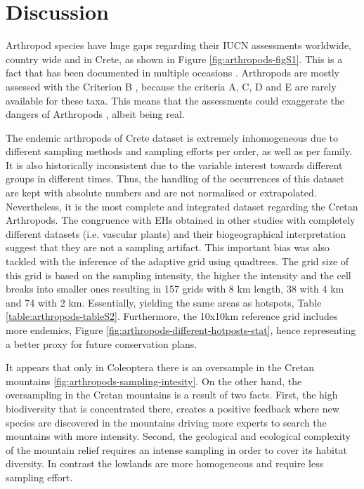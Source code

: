 \section{Discussion}
\label{sec:arthropods-discussion}

Arthropod species have huge gaps regarding their IUCN assessments worldwide,
country wide and in Crete, as shown in Figure \ref{fig:arthropods-figS1}. 
This is a fact that has been documented in multiple occasions \parencite{cardoso2012the-underrepresentation, chowdhury2023protected}. 
Arthropods are mostly assessed with the Criterion B \parencite{cardoso2011adapting,carpaneto2015a-red-list},
because the criteria A, C, D and E are rarely available for these taxa.
This means that the assessments could exaggerate the dangers of Arthropods \parencite{cardoso2011adapting},
albeit being real. 

The endemic arthropods of Crete dataset is extremely inhomogeneous due to
different sampling methods and sampling efforts per order, as well as per family.
It is also historically inconsistent due to the variable interest towards
different groups in different times.
Thus, the handling of the occurrences of this dataset are kept with absolute numbers 
and are not normalised or extrapolated. 
Nevertheless, it is the most complete and integrated dataset regarding the Cretan Arthropods.
The congruence with EHs obtained in other studies with completely different
datasets (i.e. vascular plants) \parencite{kougioumoutzis2020plant} and their biogeographical interpretation suggest
that they are not a sampling artifact. 
This important bias was also tackled with the inference of the adaptive grid using quadtrees.
The grid size of this grid is based on the sampling intensity, the higher the
intensity and the cell breaks into smaller ones resulting in 157 grids with
8 km length, 38 with 4 km and 74 with 2 km. Essentially, yielding the same areas 
as hotspots, Table \ref{table:arthropods-tableS2}. Furthermore, the 10x10km reference 
grid includes more endemics, Figure \ref{fig:arthropods-different-hotposts-stat},
hence representing a better proxy for future conservation plans.

It appears that only in Coleoptera there is an oversample in the Cretan mountains \ref{fig:arthropods-sampling-intesity}.
On the other hand, the oversampling in the Cretan mountains is a result of two facts.
First, the high biodiversity that is concentrated there, creates a positive
feedback where new species are discovered in the mountains driving more experts
to search the mountains with more intensity.
Second, the geological and ecological
complexity of the mountain relief requires an intense sampling in order to
cover its habitat diversity. In contrast the lowlands are more homogeneous and require less sampling effort.

